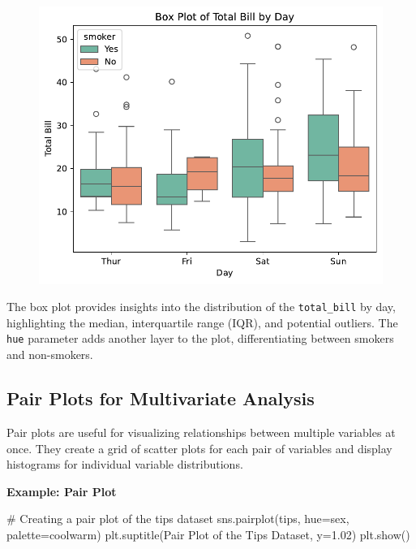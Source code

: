 \documentclass[
  letterpaper,
  DIV=11,
  numbers=noendperiod]{scrreprt}
\newenvironment{Shaded}{\begin{snugshade}}{\end{snugshade}}
\newcommand{\CommentTok}[1]{\textcolor[rgb]{0.37,0.37,0.37}{#1}}
\newcommand{\FloatTok}[1]{\textcolor[rgb]{0.68,0.00,0.00}{#1}}
\newcommand{\NormalTok}[1]{\textcolor[rgb]{0.00,0.23,0.31}{#1}}
\newcommand{\OperatorTok}[1]{\textcolor[rgb]{0.37,0.37,0.37}{#1}}
\newcommand{\StringTok}[1]{\textcolor[rgb]{0.13,0.47,0.30}{#1}}
\begin{document}
\begin{figure}[H]

{\centering \includegraphics{15_Data_Vis_files/figure-pdf/cell-14-output-1.pdf}

}

\end{figure}

The box plot provides insights into the distribution of the
\texttt{total\_bill} by day, highlighting the median, interquartile
range (IQR), and potential outliers. The \texttt{hue} parameter adds
another layer to the plot, differentiating between smokers and
non-smokers.

\hypertarget{pair-plots-for-multivariate-analysis}{%
\subsection{Pair Plots for Multivariate
Analysis}\label{pair-plots-for-multivariate-analysis}}

Pair plots are useful for visualizing relationships between multiple
variables at once. They create a grid of scatter plots for each pair of
variables and display histograms for individual variable distributions.

\textbf{Example: Pair Plot}

\begin{Shaded}
\begin{Highlighting}[]
\CommentTok{\# Creating a pair plot of the tips dataset}
\NormalTok{sns.pairplot(tips, hue}\OperatorTok{=}\StringTok{\textquotesingle{}sex\textquotesingle{}}\NormalTok{, palette}\OperatorTok{=}\StringTok{\textquotesingle{}coolwarm\textquotesingle{}}\NormalTok{)}
\NormalTok{plt.suptitle(}\StringTok{\textquotesingle{}Pair Plot of the Tips Dataset\textquotesingle{}}\NormalTok{, y}\OperatorTok{=}\FloatTok{1.02}\NormalTok{)}
\NormalTok{plt.show()}
\end{Highlighting}
\end{Shaded}
\end{document}
